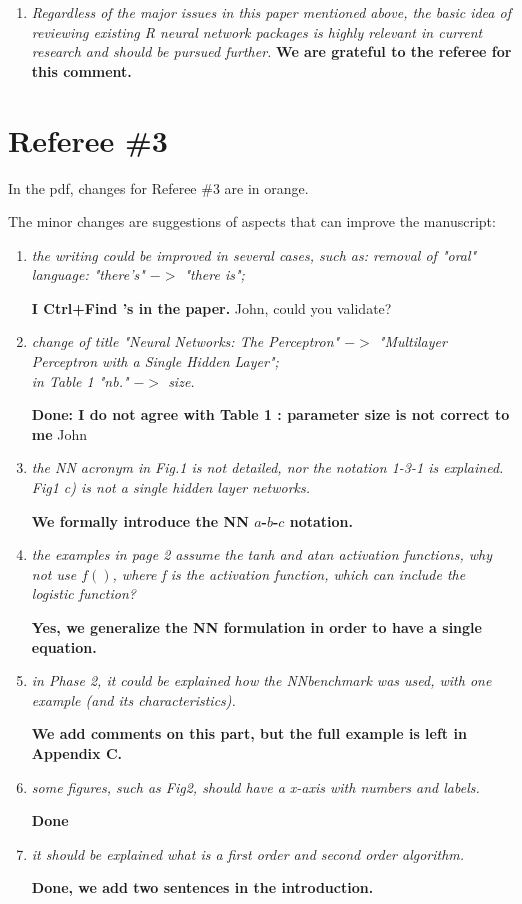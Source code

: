 \documentclass[12pt]{article}
\newcommand{\orange}[1]{{\color{orange}#1}}
\newcommand{\red}[1]{{\color{red}#1}}
\begin{document}
\begin{enumerate}[resume]
\item \textit{Regardless of the major issues in this paper mentioned above, the basic idea of reviewing existing R neural network packages is highly relevant in current research and should be pursued further.
}
\textbf{We are grateful to the referee for this comment.}
\end{enumerate}



\section{Referee \#3}\label{referee3}

In the pdf, changes for Referee  \#3 are in \orange{orange}.  

The minor changes are suggestions of aspects that can improve the manuscript:
\begin{enumerate}
\item \textit{the writing could be improved in several cases, such as: removal of "oral" language: "there’s" $->$ "there is";}

\textbf{I Ctrl+Find 's in the paper.}
\red{John, could you validate?}

\item \textit{change of title "Neural Networks: The Perceptron" $->$ "Multilayer Perceptron with a Single Hidden Layer";\\
 in Table 1 "nb." $->$ size.}
 
 \textbf{Done: I do not agree with Table 1 : parameter size is not correct to me}
\red{John}

\item \textit{the NN acronym in Fig.1 is not detailed, nor the notation 1-3-1 is explained.\\ 
Fig1 c) is not a single hidden layer networks.}

\textbf{We formally introduce the NN $a$-$b$-$c$ notation.}


\item \textit{the examples in page 2 assume the tanh and atan activation functions, why not use $f()$, where f is the activation function, which can include the logistic function?}

\textbf{Yes, we generalize the NN formulation in order to have a single equation.}


\item \textit{in Phase 2, it could be explained how the NNbenchmark was used, with one example (and its characteristics).}

\textbf{We add comments on this part, but the full example is left in Appendix C.}


\item \textit{some figures, such as Fig2, should have a x-axis with numbers and labels.}

\textbf{Done}


\item \textit{it should be explained what is a first order and second order algorithm.}

\textbf{Done, we add two sentences in the introduction.}


\end{enumerate}
\end{document}
